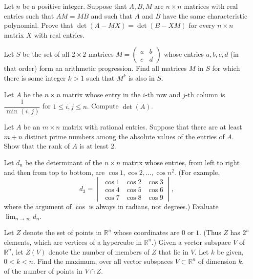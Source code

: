 \documentclass[12pt]{article}
\begin{document}
\begin{problem}
Let $n$ be a positive integer. Suppose that $A,B,M$ are $n\times n$ matrices with real entries such that $AM=MB$ and such that $A$ and $B$ have the same characteristic polynomial. Prove that $\det(A-MX) = \det(B-XM)$ for every $n\times n$ matrix $X$ with real entries.
\end{problem}

\begin{problem}
Let $S$ be the set of all $2\times 2$ matrices $M = \begin{pmatrix}a & b\\ c & d\end{pmatrix}$ whose entries $a,b,c,d$ (in that order) form an arithmetic progression. Find all matrices $M$ in $S$ for which there is some integer $k>1$ such that $M^k$ is also in $S$.
\end{problem}

\begin{problem}
Let $A$ be the $n\times n$ matrix whose entry in the $i$-th row and $j$-th column is $\dfrac{1}{\min(i,j)}$ for $1\le i,j\le n$. Compute $\det(A)$.
\end{problem}

\begin{problem}
Let $A$ be an $m\times n$ matrix with rational entries. Suppose that there are at least $m+n$ distinct prime numbers among the absolute values of the entries of $A$. Show that the rank of $A$ is at least $2$.
\end{problem}

\begin{problem}
Let $d_n$ be the determinant of the $n\times n$ matrix whose entries, from left to right and then from top to bottom, are $\cos 1,\cos 2,\dots,\cos n^2$. (For example,
\[
d_3 = \begin{vmatrix}\cos1 & \cos2 & \cos3\\ \cos4 & \cos5 & \cos6\\ \cos7 & \cos8 & \cos9\end{vmatrix},
\]
where the argument of $\cos$ is always in radians, not degrees.) Evaluate $\lim_{n\to\infty} d_n$.
\end{problem}

\begin{problem}
Let $Z$ denote the set of points in $\mathbb{R}^n$ whose coordinates are $0$ or $1$. (Thus $Z$ has $2^n$ elements, which are vertices of a hypercube in $\mathbb{R}^n$.) Given a vector subspace $V$ of $\mathbb{R}^n$, let $Z(V)$ denote the number of members of $Z$ that lie in $V$. Let $k$ be given, $0<k<n$. Find the maximum, over all vector subspaces $V\subset\mathbb{R}^n$ of dimension $k$, of the number of points in $V\cap Z$.
\end{problem}
\end{document}
